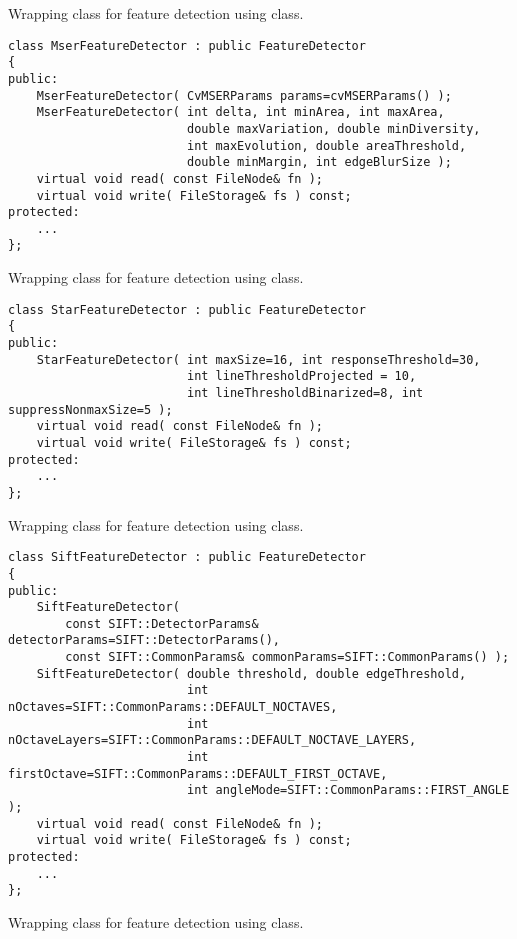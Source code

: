 Wrapping class for feature detection using  class.

\begin{lstlisting}
class MserFeatureDetector : public FeatureDetector
{
public:
    MserFeatureDetector( CvMSERParams params=cvMSERParams() );
    MserFeatureDetector( int delta, int minArea, int maxArea, 
                         double maxVariation, double minDiversity,
                         int maxEvolution, double areaThreshold, 
                         double minMargin, int edgeBlurSize );
    virtual void read( const FileNode& fn );
    virtual void write( FileStorage& fs ) const;
protected:
    ...
};
\end{lstlisting}

Wrapping class for feature detection using  class.

\begin{lstlisting}
class StarFeatureDetector : public FeatureDetector
{
public:
    StarFeatureDetector( int maxSize=16, int responseThreshold=30, 
                         int lineThresholdProjected = 10,
                         int lineThresholdBinarized=8, int suppressNonmaxSize=5 );
    virtual void read( const FileNode& fn );
    virtual void write( FileStorage& fs ) const;
protected:
    ...
};
\end{lstlisting}

Wrapping class for feature detection using  class.

\begin{lstlisting}
class SiftFeatureDetector : public FeatureDetector
{
public:
    SiftFeatureDetector( 
        const SIFT::DetectorParams& detectorParams=SIFT::DetectorParams(),
        const SIFT::CommonParams& commonParams=SIFT::CommonParams() );
    SiftFeatureDetector( double threshold, double edgeThreshold,
                         int nOctaves=SIFT::CommonParams::DEFAULT_NOCTAVES,
                         int nOctaveLayers=SIFT::CommonParams::DEFAULT_NOCTAVE_LAYERS,
                         int firstOctave=SIFT::CommonParams::DEFAULT_FIRST_OCTAVE,
                         int angleMode=SIFT::CommonParams::FIRST_ANGLE );
    virtual void read( const FileNode& fn );
    virtual void write( FileStorage& fs ) const;
protected:
    ...
};
\end{lstlisting}

Wrapping class for feature detection using  class.

